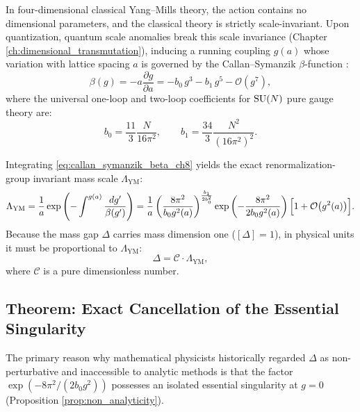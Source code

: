 In four-dimensional classical Yang--Mills theory, the action contains no dimensional parameters, and the classical theory is strictly scale-invariant. Upon quantization, quantum scale anomalies break this scale invariance (Chapter \ref{ch:dimensional_transmutation}), inducing a running coupling $g(a)$ whose variation with lattice spacing $a$ is governed by the Callan--Symanzik $\beta$-function \cite{Callan1970,Symanzik1970}:
\begin{equation}
\label{eq:callan_symanzik_beta_ch8}
\beta(g) = -a \frac{\partial g}{\partial a} = -b_0 \, g^3 - b_1 \, g^5 - \mathcal{O}(g^7),
\end{equation}
where the universal one-loop and two-loop coefficients for $\mathrm{SU}(N)$ pure gauge theory are:
\begin{equation}
b_0 = \frac{11}{3} \frac{N}{16\pi^2}, \qquad b_1 = \frac{34}{3} \frac{N^2}{(16\pi^2)^2}.
\end{equation}

Integrating \eqref{eq:callan_symanzik_beta_ch8} yields the exact renormalization-group invariant mass scale $\Lambda_{\mathrm{YM}}$:
\begin{equation}
\label{eq:lambda_ym_exact_integral_ch8}
\Lambda_{\mathrm{YM}} = \frac{1}{a} \exp\left( -\int^{g(a)} \frac{dg'}{\beta(g')} \right) = \frac{1}{a} \left( \frac{8\pi^2}{b_0 g^2(a)} \right)^{\frac{b_1}{2 b_0^2}} \exp\left( -\frac{8\pi^2}{2 b_0 g^2(a)} \right) \Bigl[ 1 + \mathcal{O}\bigl(g^2(a)\bigr) \Bigr].
\end{equation}
Because the mass gap $\Delta$ carries mass dimension one ($[\Delta] = 1$), in physical units it must be proportional to $\Lambda_{\mathrm{YM}}$:
\begin{equation}
\label{eq:delta_lambda_proportionality}
\Delta = \mathcal{C} \cdot \Lambda_{\mathrm{YM}},
\end{equation}
where $\mathcal{C}$ is a pure dimensionless number.

\subsection{Theorem: Exact Cancellation of the Essential Singularity}
\label{subsec:singularity_cancellation_proof}

The primary reason why mathematical physicists historically regarded $\Delta$ as non-perturbative and inaccessible to analytic methods is that the factor $\exp(-8\pi^2/(2b_0 g^2))$ possesses an isolated essential singularity at $g = 0$ (Proposition \ref{prop:non_analyticity}).

